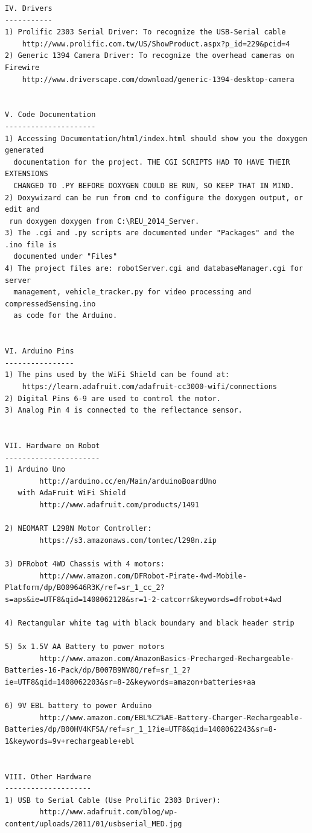 \documentclass[english]{article}\usepackage[]{graphicx}\usepackage[]{color}
\begin{document}
\begin{appendix}
\begin{verbatim}
IV. Drivers
-----------
1) Prolific 2303 Serial Driver: To recognize the USB-Serial cable
	http://www.prolific.com.tw/US/ShowProduct.aspx?p_id=229&pcid=4
2) Generic 1394 Camera Driver: To recognize the overhead cameras on Firewire
	http://www.driverscape.com/download/generic-1394-desktop-camera


V. Code Documentation
---------------------
1) Accessing Documentation/html/index.html should show you the doxygen generated
  documentation for the project. THE CGI SCRIPTS HAD TO HAVE THEIR EXTENSIONS
  CHANGED TO .PY BEFORE DOXYGEN COULD BE RUN, SO KEEP THAT IN MIND. 
2) Doxywizard can be run from cmd to configure the doxygen output, or edit and
 run doxygen doxygen from C:\REU_2014_Server.
3) The .cgi and .py scripts are documented under "Packages" and the .ino file is
  documented under "Files"
4) The project files are: robotServer.cgi and databaseManager.cgi for server
  management, vehicle_tracker.py for video processing and compressedSensing.ino
  as code for the Arduino.


VI. Arduino Pins
----------------
1) The pins used by the WiFi Shield can be found at:
	https://learn.adafruit.com/adafruit-cc3000-wifi/connections
2) Digital Pins 6-9 are used to control the motor.
3) Analog Pin 4 is connected to the reflectance sensor.


VII. Hardware on Robot
----------------------
1) Arduino Uno
		http://arduino.cc/en/Main/arduinoBoardUno
   with AdaFruit WiFi Shield
   		http://www.adafruit.com/products/1491

2) NEOMART L298N Motor Controller:
		https://s3.amazonaws.com/tontec/l298n.zip

3) DFRobot 4WD Chassis with 4 motors:
  		http://www.amazon.com/DFRobot-Pirate-4wd-Mobile-Platform/dp/B009646R3K/ref=sr_1_cc_2?s=aps&ie=UTF8&qid=1408062128&sr=1-2-catcorr&keywords=dfrobot+4wd

4) Rectangular white tag with black boundary and black header strip

5) 5x 1.5V AA Battery to power motors
		http://www.amazon.com/AmazonBasics-Precharged-Rechargeable-Batteries-16-Pack/dp/B007B9NV8Q/ref=sr_1_2?ie=UTF8&qid=1408062203&sr=8-2&keywords=amazon+batteries+aa

6) 9V EBL battery to power Arduino
		http://www.amazon.com/EBL%C2%AE-Battery-Charger-Rechargeable-Batteries/dp/B00HV4KFSA/ref=sr_1_1?ie=UTF8&qid=1408062243&sr=8-1&keywords=9v+rechargeable+ebl


VIII. Other Hardware
--------------------
1) USB to Serial Cable (Use Prolific 2303 Driver):
		http://www.adafruit.com/blog/wp-content/uploads/2011/01/usbserial_MED.jpg


\end{verbatim}
\end{appendix}
\end{document}
